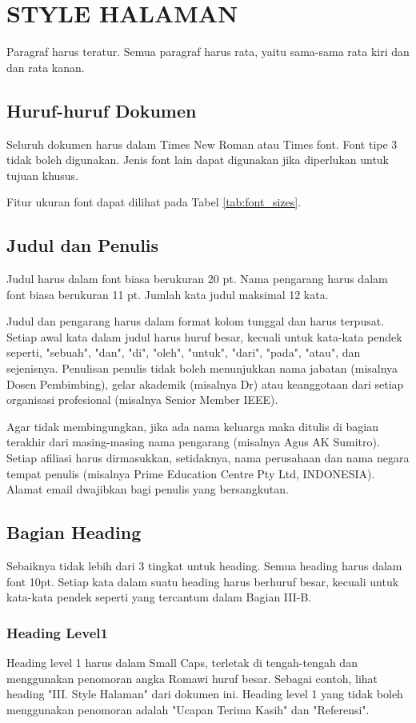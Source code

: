 \documentclass[10pt,twocolumn]{article}
\begin{document}
\section{\MakeUppercase{Style Halaman}}
Paragraf harus teratur. Semua paragraf harus rata, yaitu sama-sama rata kiri dan dan rata kanan.

\subsection{Huruf-huruf Dokumen}
Seluruh dokumen harus dalam Times New Roman atau Times font. Font tipe 3 tidak boleh digunakan. Jenis font lain dapat digunakan jika diperlukan untuk tujuan khusus.

Fitur ukuran font dapat dilihat pada Tabel \ref{tab:font_sizes}.

\subsection{Judul dan Penulis}
Judul harus dalam font biasa berukuran 20 pt. Nama pengarang harus dalam font biasa berukuran 11 pt. Jumlah kata judul maksimal 12 kata.

Judul dan pengarang harus dalam format kolom tunggal dan harus terpusat. Setiap awal kata dalam judul harus huruf besar, kecuali untuk kata-kata pendek seperti, "sebuah", "dan", "di", "oleh", "untuk", "dari", "pada", "atau", dan sejenisnya. Penulisan penulis tidak boleh menunjukkan nama jabatan (misalnya Dosen Pembimbing), gelar akademik (misalnya Dr) atau keanggotaan dari setiap organisasi profesional (misalnya Senior Member IEEE).

Agar tidak membingungkan, jika ada nama keluarga maka ditulis di bagian terakhir dari masing-masing nama pengarang (misalnya Agus AK Sumitro). Setiap afiliasi harus dirmasukkan, setidaknya, nama perusahaan dan nama negara tempat penulis (misalnya Prime Education Centre Pty Ltd, INDONESIA). Alamat email dwajibkan bagi penulis yang bersangkutan.

\subsection{Bagian Heading}
Sebaiknya tidak lebih dari 3 tingkat untuk heading. Semua heading harus dalam font 10pt. Setiap kata dalam suatu heading harus berhuruf besar, kecuali untuk kata-kata pendek seperti yang tercantum dalam Bagian III-B.

\subsubsection{Heading Level1} Heading level 1 harus dalam Small Caps, terletak di tengah-tengah dan menggunakan penomoran angka Romawi huruf besar. Sebagai contoh, lihat heading "III. Style Halaman" dari dokumen ini. Heading level 1 yang tidak boleh menggunakan penomoran adalah "Ucapan Terima Kasih" dan "Referensi".
\end{document}
